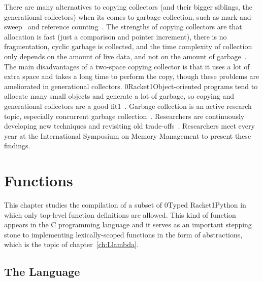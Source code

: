 \documentclass[7x10]{TimesAPriori_MIT}%
\def\racketEd{0}
\def\pythonEd{1}
\def\edition{0}
\newcommand{\racket}[1]{{\if\edition\racketEd{#1}\fi}}
\newcommand{\python}[1]{{\if\edition\pythonEd #1\fi}}
\numberwithin{theorem}{chapter}
\numberwithin{definition}{chapter}
\numberwithin{equation}{chapter}
\begin{document}
There are many alternatives to copying collectors (and their bigger
siblings, the generational collectors) when its comes to garbage
collection, such as mark-and-sweep~\citep{McCarthy:1960dz} and
reference counting~\citep{Collins:1960aa}.  The strengths of copying
collectors are that allocation is fast (just a comparison and pointer
increment), there is no fragmentation, cyclic garbage is collected,
and the time complexity of collection only depends on the amount of
live data, and not on the amount of garbage~\citep{Wilson:1992fk}. The
main disadvantages of a two-space copying collector is that it uses a
lot of extra space and takes a long time to perform the copy, though
these problems are ameliorated in generational collectors.
\racket{Racket}\python{Object-oriented} programs tend to allocate many
small objects and generate a lot of garbage, so copying and
generational collectors are a good fit\python{~\citep{Dieckmann99}}.
Garbage collection is an active research topic, especially concurrent
garbage collection~\citep{Tene:2011kx}. Researchers are continuously
developing new techniques and revisiting old
trade-offs~\citep{Blackburn:2004aa,Jones:2011aa,Shahriyar:2013aa,Cutler:2015aa,Shidal:2015aa,Osterlund:2016aa,Jacek:2019aa,Gamari:2020aa}. Researchers
meet every year at the International Symposium on Memory Management to
present these findings.



\chapter{Functions}
\label{ch:Lfun}
\setcounter{footnote}{0}

This chapter studies the compilation of a subset of \racket{Typed
  Racket}\python{Python} in which only top-level function definitions
are allowed. This kind of function appears in the C programming
language and it serves as an important stepping stone to implementing
lexically-scoped functions in the form of  abstractions,
which is the topic of chapter~\ref{ch:Llambda}.

\section{The \LangFun{} Language}
\end{document}
